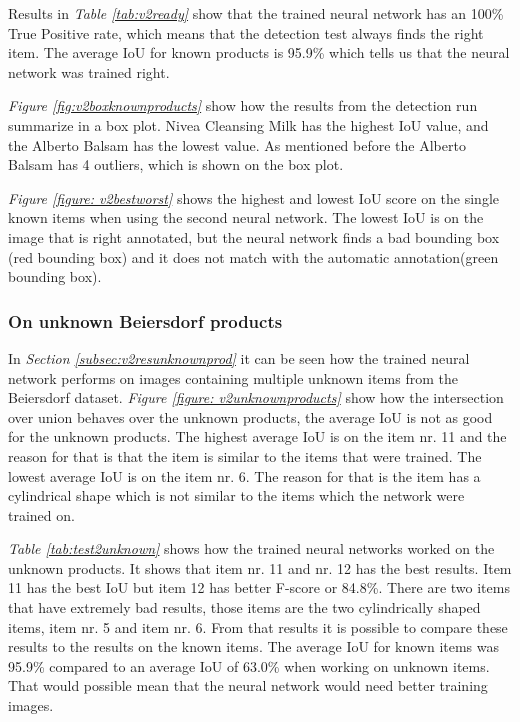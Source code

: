 Results in \textit{Table \ref{tab:v2ready}} show that the trained neural network has an 100\% True Positive rate, which means that the detection test always finds the right item. The average IoU for known products is 95.9\% which tells us that the neural network was trained right.

\textit{Figure \ref{fig:v2boxknownproducts}} show how the results from the detection run summarize in a box plot. Nivea Cleansing Milk has the highest IoU value, and the Alberto Balsam has the lowest value. As mentioned before the Alberto Balsam has 4 outliers, which is shown on the box plot.

\textit{Figure \ref{figure: v2bestworst}} shows the highest and lowest IoU score on the single known items when using the second neural network. The lowest IoU is on the image that is right annotated, but the neural network finds a bad bounding box (red bounding box) and it does not match with the automatic annotation(green bounding box).


\subsubsection{On unknown Beiersdorf products}
In \textit{Section \ref{subsec:v2resunknownprod}} it can be seen how the trained neural network performs on images containing multiple unknown items from the Beiersdorf dataset. \textit{Figure \ref{figure: v2unknownproducts}} show how the intersection over union behaves over the unknown products, the average IoU is not as good for the unknown products. The highest average IoU is on the item nr. 11 and the reason for that is that the item is similar to the items that were trained. The lowest average IoU is on the item nr. 6. The reason for that is the item has a cylindrical shape which is not similar to the items which the network were trained on.  

\textit{Table \ref{tab:test2unknown}} shows how the trained neural networks worked on the unknown products. It shows that item nr. 11 and nr. 12 has the best results. Item 11 has the best IoU but item 12 has better F-score or 84.8\%. There are two items that have extremely bad results, those items are the two cylindrically shaped items, item nr. 5 and item nr. 6. From that results it is possible to compare these results to the results on the known items. The average IoU for known items was 95.9\% compared to an average IoU of 63.0\% when working on unknown items. That would possible mean that the neural network would need better training images. 

